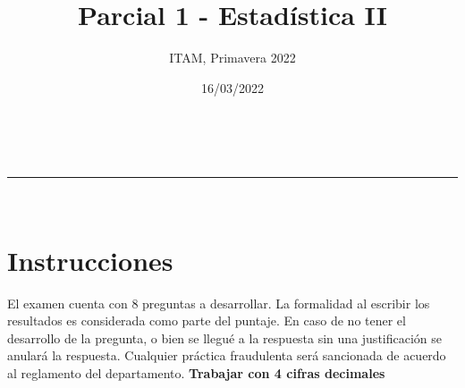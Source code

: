 \documentclass[addpoints]{exam}
\makeatletter
\newcommand{\linia}{\rule{\linewidth}{0.5pt}}
\theoremstyle{mytheor}
\renewcommand{\maketitle}{
    \begin{center}
    \vspace{2ex}
    {\huge \textsc{\@title}}
    \vspace{1ex}
    \\
    \linia\\
    \@author \hfill \@date
    \vspace{4ex}
    \end{center}
  }
\makeatother
\begin{document}
  
  \title{Parcial 1 - Estadística II}
  
  \author{ITAM, Primavera 2022}
  
  \date{16/03/2022}
  
  \maketitle
  
  \section*{Instrucciones}
  
  El examen cuenta con 8 preguntas a desarrollar. La formalidad al escribir los resultados es considerada como parte del puntaje. En caso de no tener el desarrollo de la pregunta, o bien se llegué a la respuesta sin una justificación se anulará la respuesta. Cualquier práctica fraudulenta será sancionada de acuerdo al reglamento del departamento. \textbf{Trabajar con 4 cifras decimales}

\vspace{10pt}
\end{document}
